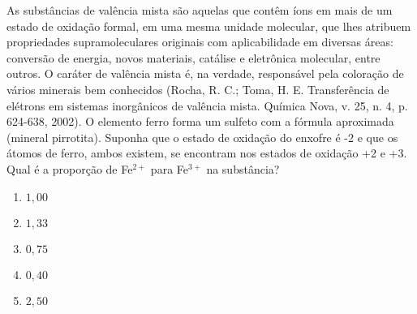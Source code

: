 As substâncias de valência mista são aquelas que contêm íons em mais de um estado de oxidação formal, em uma mesma unidade molecular, que lhes atribuem propriedades supramoleculares originais com aplicabilidade em diversas áreas: conversão de energia, novos materiais, catálise e eletrônica molecular, entre outros.
O caráter de valência mista é, na verdade, responsável pela coloração de vários minerais bem conhecidos (Rocha, R. C.; Toma, H. E. Transferência de elétrons em sistemas inorgânicos de valência mista. Química Nova, v. 25, n. 4, p. 624-638, 2002).
O elemento ferro forma um sulfeto com a fórmula aproximada  (mineral pirrotita).
Suponha que o estado de oxidação do enxofre é -2 e que os átomos de ferro, ambos existem, se encontram nos estados de oxidação +2 e +3. Qual é a proporção de Fe$^{2+}$ para Fe$^{3+}$ na substância? 

\begin{enumerate}[label = (\alph*)]
	\item $1,00$
	\item $1,33$
	\item $0,75$
	\item $0,40$
	\item $2,50$
\end{enumerate}
